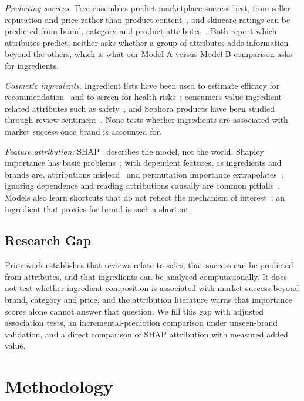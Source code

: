 \documentclass[11pt,a4paper]{article}
\begin{document}
\emph{Predicting success.} Tree ensembles predict marketplace success best, from seller reputation and price rather than product content~\cite{aulya2025}, and skincare ratings can be predicted from brand, category and product attributes~\cite{sari2026}. Both report which attributes predict; neither asks whether a group of attributes adds information beyond the others, which is what our Model A versus Model B comparison asks for ingredients.

\emph{Cosmetic ingredients.} Ingredient lists have been used to estimate efficacy for recommendation~\cite{lee2024} and to screen for health risks~\cite{wang2025}; consumers value ingredient-related attributes such as safety~\cite{shim2024}, and Sephora products have been studied through review sentiment~\cite{rizqia2026}. None tests whether ingredients are associated with market success once brand is accounted for.

\emph{Feature attribution.} SHAP~\cite{lundberg2017shap} describes the model, not the world. Shapley importance has basic problems~\cite{kumar2020}; with dependent features, as ingredients and brands are, attributions mislead~\cite{aas2021} and permutation importance extrapolates~\cite{hooker2021}; ignoring dependence and reading attributions causally are common pitfalls~\cite{molnar2022}. Models also learn shortcuts that do not reflect the mechanism of interest~\cite{geirhos2020}; an ingredient that proxies for brand is such a shortcut.

\subsection{Research Gap}
Prior work establishes that reviews relate to sales, that success can be predicted from attributes, and that ingredients can be analysed computationally. It does not test whether ingredient composition is associated with market success beyond brand, category and price, and the attribution literature warns that importance scores alone cannot answer that question. We fill this gap with adjusted association tests, an incremental-prediction comparison under unseen-brand validation, and a direct comparison of SHAP attribution with measured added value.

\section{Methodology}
\end{document}
